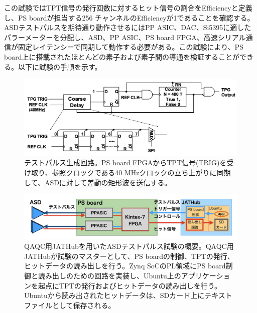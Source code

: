 この試験ではTPT信号の発行回数に対するヒット信号の割合をEfficiencyと定義し、PS boardが担当する256 チャンネルのEfficiencyが1であることを確認する。
ASDテストパルスを期待通り動作させるにはPP ASIC、DAC、Si5395に適したパラーメーターを分配し、ASD、PP ASIC、PS board FPGA、高速シリアル通信が固定レイテンシーで同期して動作する必要がある。この試験により、PS board上に搭載されたほとんどの素子および素子間の導通を検証することができる。以下に試験の手順を示す。


\begin{figure} 
    \centering
    \includegraphics[width=16cm]{fig/QAQC/PSBtpg.png}
    \caption[テストパルス生成回路]{テストパルス生成回路。PS board FPGAからTPT信号(TRIG)を受け取り、参照クロックである40 MHzクロックの立ち上がりに同期して、ASDに対して差動の矩形波を送信する。}
    \label{PSBtpg}
\end{figure}

\begin{figure} 
\centering
\includegraphics[width=16cm]{fig/QAQC/QAQCasdtp.png}
\caption[QAQC用JATHubを用いたASDテストパルス試験]{QAQC用JATHubを用いたASDテストパルス試験の概要。QAQC用JATHubが試験のマスターとして、PS boardの制御、TPTの発行、ヒットデータの読み出しを行う。Zynq SoCのPL領域にPS board制御と読み出しのための回路を実装し、Ubuntu上のアプリケーションを起点にTPTの発行およびヒットデータの読み出しを行う。Ubuntuから読み出されたヒットデータは、SDカード上にテキストファイルとして保存される。}
\label{QAQCasdtp}
\end{figure}

